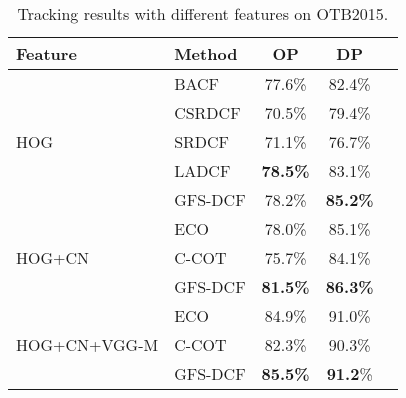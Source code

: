 \documentclass[10pt,twocolumn,letterpaper]{article}
\begin{document}
\begin{table}[t]
\footnotesize
\renewcommand{\arraystretch}{1.2}
\caption{Tracking results with different features on OTB2015.}
\label{detailed_results}
\centering
\begin{tabular}{l|l|ccc}
\hline
Feature & Method & OP & DP \\
\hline
\hline
\multirow{5}{*}{HOG} & BACF & 77.6\% & 82.4\% \\
& CSRDCF & 70.5\% & 79.4\%\\
& SRDCF & 71.1\% & 76.7\% \\
& LADCF & \textbf{78.5\%} & 83.1\% \\
& GFS-DCF & 78.2\% & \textbf{85.2\%} \\
\hline
\multirow{3}{*}{HOG+CN}& ECO & 78.0\% & 85.1\% \\
& C-COT & 75.7\% & 84.1\%\\
& GFS-DCF & \textbf{81.5\%} & \textbf{86.3\%} \\
\hline
\multirow{3}{*}{HOG+CN+VGG-M}& ECO & 84.9\% & 91.0\%\\
& C-COT & 82.3\% & 90.3\%\\
& GFS-DCF & \textbf{85.5\%} & \textbf{91.2}\%\\
\hline
\end{tabular}
\end{table}
\end{document}
